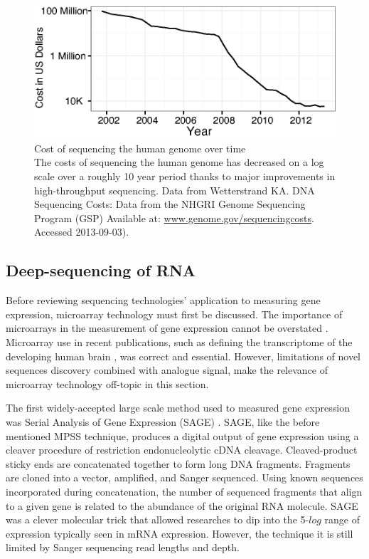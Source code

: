     \begin{figure} %
      \centering 
      \includegraphics{Figures/Intro/Sequencing_costs_over_time.eps}
      \caption[Cost of sequencing the human genome over time]
      {
        Cost of sequencing the human genome over time\\[0.25cm]
        The costs of sequencing the human genome has decreased on a log scale over a roughly 10 year period thanks to major improvements in high-throughput sequencing. Data from Wetterstrand KA. DNA Sequencing Costs: Data from the NHGRI Genome Sequencing Program (GSP) Available at: \url{www.genome.gov/sequencingcosts}. Accessed 2013-09-03).
        }
      \label{Intro:fig:SeqCosts}
      \end{figure}

  \subsection{Deep-sequencing of RNA}\label{Intro:subsec:Types of HTS}

    Before reviewing sequencing technologies' application to measuring gene expression, microarray technology must first be discussed. The importance of microarrays in the measurement of gene expression cannot be overstated \citep{Shendure2008,Marioni2008}. Microarray use in recent publications, such as defining the transcriptome of the developing human brain \cite{Miller2014}, was correct and essential. However, limitations of novel sequences discovery combined with analogue signal, make the relevance of microarray technology off-topic in this section.

    The first widely-accepted large scale method used to measured gene expression was Serial Analysis of Gene Expression (SAGE) \citep{Velculescu1995a}. SAGE, like the before mentioned MPSS technique, produces a digital output of gene expression using a cleaver procedure of restriction endonucleolytic cDNA cleavage. Cleaved-product sticky ends are concatenated together to form long DNA fragments. Fragments are cloned into a vector, amplified, and Sanger sequenced. Using known sequences incorporated during concatenation, the number of sequenced fragments that align to a given gene is related to the abundance of the original RNA molecule. SAGE was a clever molecular trick that allowed researches to dip into the 5-$log$ range of expression typically seen in mRNA expression. However, the technique it is still limited by Sanger sequencing read lengths and depth.

